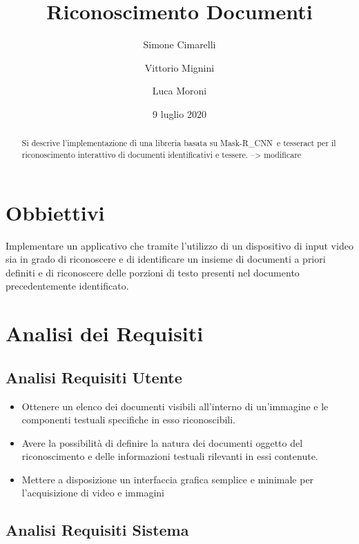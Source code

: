 \documentclass[12pt,a4paper]{article}
\newcommand{\mrcnn}{Mask-R\_CNN}
\begin{document}
\title{Riconoscimento Documenti}
\author{Simone Cimarelli \and Vittorio Mignini \and Luca Moroni}
\date{9 luglio 2020}

\maketitle

\begin{abstract}
    Si descrive l'implementazione di una libreria basata su \mrcnn\ e
    tesseract per il riconoscimento interattivo di documenti
    identificativi e tessere.
    --> modificare %
\end{abstract}

\section{Obbiettivi}

Implementare un applicativo che tramite l'utilizzo di un dispositivo di
input video sia in grado di riconoscere e di identificare un insieme di
documenti a priori definiti e di riconoscere delle porzioni di testo
presenti nel documento precedentemente identificato.

\section{Analisi dei Requisiti}
\subsection{Analisi Requisiti Utente}

\begin{itemize}
    \item Ottenere un elenco dei documenti visibili all'interno di
        un'immagine e le componenti testuali specifiche in esso
        riconoscibili.
    \item Avere la possibilità di definire la natura dei documenti
        oggetto del riconoscimento e delle informazioni testuali
        rilevanti in essi contenute.
    \item Mettere a disposizione un interfaccia grafica semplice e
        minimale per l'acquisizione di video e immagini
\end{itemize}

\subsection{Analisi Requisiti Sistema}
\end{document}
